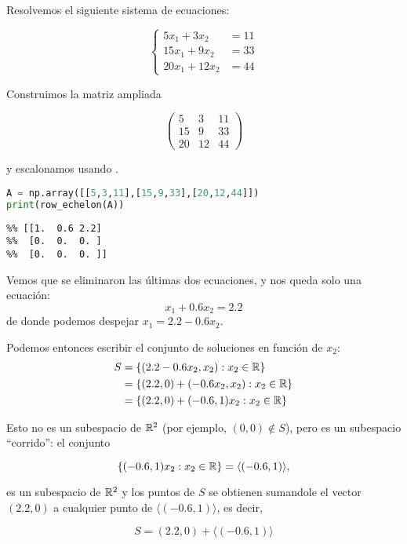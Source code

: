 \begin{ejemplo} Resolvemos el siguiente sistema de ecuaciones:

$$
\left\{\begin{aligned}
5x_1 + 3x_2 &= 11 \\
15x_1 + 9x_2 &= 33 \\
20x_1 + 12x_2 &= 44
\end{aligned}\right.
$$

Construimos la matriz ampliada

$$
\left(\begin{array}{rr|r}5&3&11\\15&9&33\\20&12&44\end{array}\right)
$$

y escalonamos usando \python.

\begin{Shaded}
\begin{lstlisting}[language=Python]
A = np.array([[5,3,11],[15,9,33],[20,12,44]])
print(row_echelon(A))
\end{lstlisting}
\end{Shaded}

\begin{verbatim}
%% [[1.  0.6 2.2]
%%  [0.  0.  0. ]
%%  [0.  0.  0. ]]
\end{verbatim}
Vemos que se eliminaron las últimas dos ecuaciones, y nos queda solo una
ecuación:
$$
x_1 + 0.6 x_2 = 2.2
$$
de donde podemos despejar $x_1 = 2.2 - 0.6x_2$.

Podemos entonces escribir el conjunto de soluciones en función de $x_2$:
\begin{align*}
S &= \{(2.2 - 0.6 x_2, x_2) : x_2 \in \mathbb R\} \\
&= \{(2.2, 0) + (-0.6 x_2, x_2) : x_2 \in \mathbb R\} \\
&= \{(2.2, 0) + (-0.6, 1) x_2 : x_2 \in \mathbb R\}
\end{align*}

Esto no es un subespacio de $\mathbb R^2$ (por ejemplo, $(0,0) \not\in S$),
pero es un subespacio ``corrido'': el conjunto

$$
 \{(-0.6, 1) x_2 : x_2 \in \mathbb R\} = \langle (-0.6, 1) \rangle,
$$

es un subespacio de $\mathbb R^2$ y los puntos de $S$ se obtienen sumandole el
vector $(2.2, 0)$ a cualquier punto de $\langle (-0.6, 1)\rangle$, es
decir,

$$
S = (2.2, 0) + \langle (-0.6, 1) \rangle
$$

\end{ejemplo}

